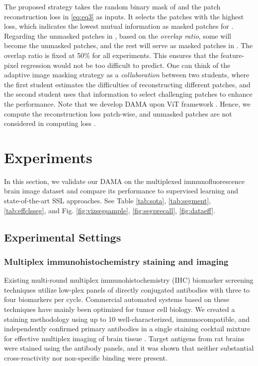\documentclass[10pt,twocolumn,letterpaper]{article}
\begin{document}
The proposed strategy takes the random binary mask of  and the patch reconstruction loss in \eqref{eq:eq3} as inputs. It selects the patches with the highest loss, which indicates the lowest mutual information  as masked patches for . Regarding the unmasked patches in , based on the \textit{overlap ratio}, some will become the unmasked patches, and the rest will serve as masked patches in . The overlap ratio is fixed at 50\% for all experiments. This ensures that the feature-pixel regression would not be too difficult to predict. One can think of the adaptive image masking strategy as a \textit{collaboration} between two students, where the first student estimates the difficulties of reconstructing different patches, and the second student uses that information to select challenging patches to enhance the performance. Note that we develop DAMA upon ViT framework \cite{vit}. Hence, we compute the reconstruction loss patch-wise, and unmasked patches are not considered in computing loss \cite{mae,data2vec,beit,simmim}. \section{Experiments}
\label{sec:exps}
In this section, we validate our DAMA on the multiplexed immunofluorescence brain image dataset and compare its performance to supervised learning and state-of-the-art SSL approaches. See Table \ref{tab:sota}, \ref{tab:segment}, \ref{tab:effclsseg}, and Fig. \ref{fig:vizsegsample}, \ref{fig:segprecall}, \ref{fig:dataeff}. 

\subsection{Experimental Settings}
\subsubsection{Multiplex immunohistochemistry staining and imaging} Existing multi-round multiplex immunohistochemistry (IHC) biomarker screening techniques utilize low-plex panels of directly conjugated antibodies with three to four biomarkers per cycle. Commercial automated systems based on these techniques have mainly been optimized for tumor cell biology. We created a staining methodology using up to 10 well-characterized, immunocompatible, and independently confirmed primary antibodies in a single staining cocktail mixture for effective multiplex imaging of brain tissue \cite{maric2021whole}. Target antigens from rat brains were stained using the antibody panels, and it was shown that neither substantial cross-reactivity nor non-specific binding were present. 
\end{document}
